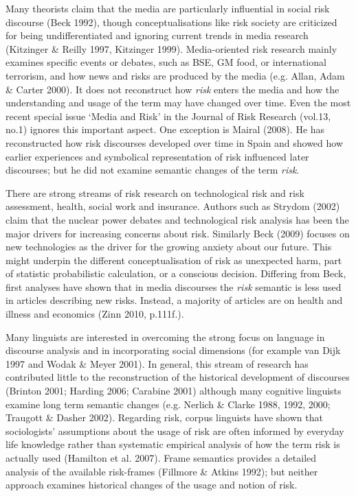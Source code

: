 Many theorists claim that the media are particularly influential in social risk discourse (Beck 1992), though conceptualisations like risk society are criticized for being undifferentiated and ignoring current trends in media research (Kitzinger \& Reilly 1997, Kitzinger 1999). Media-oriented risk research mainly examines specific events or debates, such as BSE, GM food, or international terrorism, and how news and risks are produced by the media (e.g. Allan, Adam \& Carter 2000). It does not reconstruct how \emph{risk} enters the media and how the understanding and usage of the term may have changed over time. Even the most recent special issue `Media and Risk' in the Journal of Risk Research (vol.13, no.1) ignores this important aspect. One exception is Mairal (2008). He has reconstructed how risk discourses developed over time in Spain and showed how earlier experiences and symbolical representation of risk influenced later discourses; but he did not examine semantic changes of the term \emph{risk}. 

There are strong streams of risk research on technological risk and risk assessment, health, social work and insurance. Authors such as Strydom (2002) claim that the nuclear power debates and technological risk analysis has been the major drivers for increasing concerns about risk. Similarly Beck (2009) focuses on new technologies as the driver for the growing anxiety about our future. This might underpin the different conceptualisation of risk as unexpected harm, part of statistic probabilistic calculation, or a conscious decision. Differing from Beck, first analyses have shown that in media discourses the \emph{risk} semantic is less used in articles describing new risks. Instead, a majority of articles are on health and illness and economics (Zinn 2010, p.111f.).

Many linguists are interested in overcoming the strong focus on language in discourse analysis and in incorporating social dimensions (for example van Dijk 1997 and Wodak \& Meyer 2001). In general, this stream of research has contributed little to the reconstruction of the historical development of discourses (Brinton 2001; Harding 2006; Carabine 2001) although many cognitive linguists examine long term semantic changes (e.g. Nerlich \& Clarke 1988, 1992, 2000; Traugott \& Dasher 2002). Regarding risk, corpus linguists have shown that sociologists' assumptions about the usage of risk are often informed by everyday life knowledge rather than systematic empirical analysis of how the term risk is actually used (Hamilton et al. 2007). Frame semantics provides a detailed analysis of the available risk-frames (Fillmore \& Atkins 1992); but neither approach examines historical changes of the usage and notion of risk.

